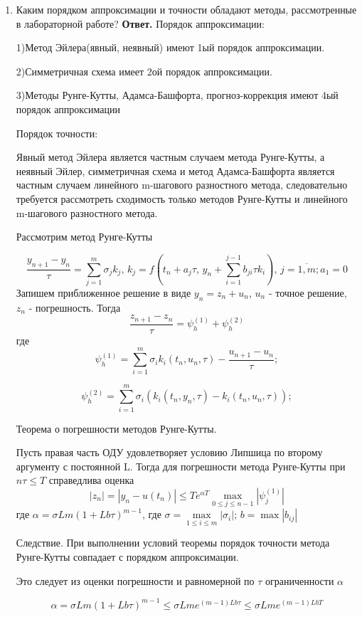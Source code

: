 \documentclass{article}
\begin{document}
\begin{enumerate}
        \item Каким порядком аппроксимации и точности обладают
        методы, рассмотренные в лабораторной работе?
        \newline
        {\bfseries Ответ. } 
        Порядок аппроксимации:
	
	
	1)Метод Эйлера(явный, неявный) имеют 1ый порядок аппроксимации.
	
	
	2)Симметричная схема имеет 2ой порядок аппроксимации.
	
	
	3)Методы Рунге-Кутты, Адамса-Башфорта, прогноз-коррекция имеют 4ый порядок аппроксимации

	
	Порядок точности: 
	
	Явный метод Эйлера является частным случаем метода Рунге-Кутты, а неявный Эйлер, симметричная схема и метод Адамса-Башфорта является частным случаем линейного m-шагового разностного метода, следовательно требуется рассмотреть сходимость только методов Рунге-Кутты и линейного m-шагового разностного метода.
	
	
	Рассмотрим метод Рунге-Кутты
	
	
	\[
	\frac{y_{n+1}-y_n}{\tau} = \sum_{j=1}^{m} \sigma_j k_j,\, k_j = f \left(t_n+a_j \tau,\, y_n + \sum_{i=1}^{j-1}b_{ji}\tau k_i\right), \, j= \overline{1,m}; a_1=0
	\]
	Запишем приближенное решение в виде $y_n=z_n+u_n$, $u_n$ - точное решение, $z_n$ - погрешность. Тогда 
	\[
	\frac{z_{n+1}-z_n}{\tau} = \psi_h^{(1)} + \psi_h^{(2)} 
	\]
	где 
	\[
	\psi_h^{(1)} = \sum_{i=1}^{m}\sigma_i k_i(t_n, u_n,\tau) - \frac{u_{n+1}-u_n}{\tau};
	\]
	
	\[
	\psi_h^{(2)} = \sum_{i=1}^{m}\sigma_i \left ( k_i(t_n, y_n,\tau) -k_i(t_n, u_n,\tau)\right);
	\]
	
	
	Теорема о погрешности методов Рунге-Кутты.
	
	
	Пусть правая часть ОДУ удовлетворяет условию Липшица по второму аргументу с постоянной L. Тогда для погрешности метода Рунге-Кутты при $n \tau \le T $ справедлива оценка
	\[
	|z_n| = |y_n-u(t_n)| \le T e^{\alpha T} \max\limits_{0\le j \le n-1}|\psi_j^{(1)}|
	\]
	где $\alpha = \sigma L m(1+Lb\tau)^{m-1}$, где $\sigma = \max \limits_{1\le i \le m} |\sigma_i|; \, b = \max|b_{ij}|$
	
	
	Следствие. При выполнении условий теоремы порядок точности метода Рунге-Кутты совпадает с порядком аппроксимации. 
	
	
	Это следует из оценки погрешности и равномерной по $\tau$ ограниченности $\alpha$
	
	\[
	\alpha = \sigma L m(1+Lb\tau)^{m-1} \le \sigma L m e^{(m-1)Lb\tau} \le \sigma L m e^{(m-1)LbT}
	\]
	

\end{enumerate}
\end{document}
